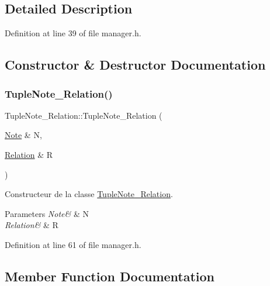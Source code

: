 \subsection{Detailed Description}


Definition at line 39 of file manager.\+h.



\subsection{Constructor \& Destructor Documentation}
\mbox{\label{class_tuple_note___relation_adc3d9a6e637361eedd2e561ae957e1fb}} 
\subsubsection{\texorpdfstring{Tuple\+Note\+\_\+\+Relation()}{TupleNote\_Relation()}}
{\footnotesize\ttfamily Tuple\+Note\+\_\+\+Relation\+::\+Tuple\+Note\+\_\+\+Relation (\begin{DoxyParamCaption}\item[{\hyperlink{class_note}{Note} \&}]{N,  }\item[{\hyperlink{class_relation}{Relation} \&}]{R }\end{DoxyParamCaption})\hspace{0.3cm}{\ttfamily [inline]}}



Constructeur de la classe \hyperlink{class_tuple_note___relation}{Tuple\+Note\+\_\+\+Relation}. 


\begin{DoxyParams}{Parameters}
{\em Note\&} & N \\
\hline
{\em Relation\&} & R \\
\hline
\end{DoxyParams}


Definition at line 61 of file manager.\+h.



\subsection{Member Function Documentation}
\mbox{\label{class_tuple_note___relation_a8a3f889d3198a14629e1cabd74985c6d}} 
